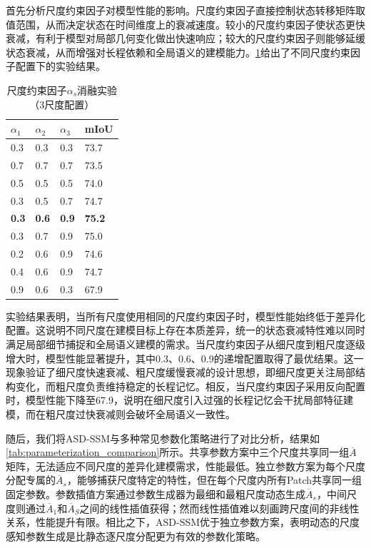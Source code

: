 \documentclass[12pt,a4paper,openany,oneside]{ctexbook}
\theoremstyle{definition}
\theoremstyle{remark}
\begin{document}
首先分析尺度约束因子对模型性能的影响。尺度约束因子直接控制状态转移矩阵取值范围，从而决定状态在时间维度上的衰减速度。较小的尺度约束因子使状态更快衰减，有利于模型对局部几何变化做出快速响应；较大的尺度约束因子则能够延缓状态衰减，从而增强对长程依赖和全局语义的建模能力。\cref{tab:alpha_ablation}给出了不同尺度约束因子配置下的实验结果。

\begin{table}[htbp!]
	\centering
	\caption{尺度约束因子$\alpha_s$消融实验（3尺度配置）}
	\label{tab:alpha_ablation}
	\begin{tabular}{@{}llll@{}}
		\toprule
		$\alpha_1$ & $\alpha_2$ & $\alpha_3$ & mIoU \\
		\midrule
		0.3 & 0.3 & 0.3 & 73.7 \\
		0.7 & 0.7 & 0.7 & 73.5 \\
		0.5 & 0.5 & 0.5 & 74.0 \\
		0.3 & 0.5 & 0.7 & 74.7 \\
		\textbf{0.3} & \textbf{0.6} & \textbf{0.9} & \textbf{75.2} \\
		0.3 & 0.7 & 0.9 & 75.0 \\
		0.2 & 0.6 & 0.9 & 74.6 \\
		0.4 & 0.6 & 0.9 & 74.7 \\
		0.9 & 0.6 & 0.3 & 67.9 \\
		\bottomrule
	\end{tabular}
\end{table}

实验结果表明，当所有尺度使用相同的尺度约束因子时，模型性能始终低于差异化配置。这说明不同尺度在建模目标上存在本质差异，统一的状态衰减特性难以同时满足局部细节捕捉和全局语义建模的需求。当尺度约束因子从细尺度到粗尺度逐级增大时，模型性能显著提升，其中0.3、0.6、0.9的递增配置取得了最优结果。这一现象验证了细尺度快速衰减、粗尺度缓慢衰减的设计思想，即细尺度更关注局部结构变化，而粗尺度负责维持稳定的长程记忆。相反，当尺度约束因子采用反向配置时，模型性能下降至67.9，说明在细尺度引入过强的长程记忆会干扰局部特征建模，而在粗尺度过快衰减则会破坏全局语义一致性。

随后，我们将ASD-SSM与多种常见参数化策略进行了对比分析，结果如\cref{tab:parameterization_comparison}所示。共享参数方案中三个尺度共享同一组$\overline{A}$矩阵，无法适应不同尺度的差异化建模需求，性能最低。独立参数方案为每个尺度分配专属的$\overline{A}_s$，能够捕获尺度特定的特性，但在每个尺度内所有Patch共享同一组固定参数。参数插值方案通过参数生成器为最细和最粗尺度动态生成$\overline{A}_s$，中间尺度则通过$\overline{A}_1$和$\overline{A}_S$之间的线性插值获得；然而线性插值难以刻画跨尺度间的非线性关系，性能提升有限。相比之下，ASD-SSM优于独立参数方案，表明动态的尺度感知参数生成是比静态逐尺度分配更为有效的参数化策略。
\end{document}
